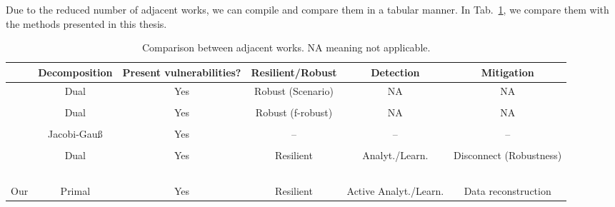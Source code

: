 \documentclass[../main.tex]{subfiles}
\begin{document}
Due to the reduced number of adjacent works, we can compile and compare them in a tabular manner.
In Tab.~\ref{tab:compare_works}, we compare them with the methods presented in this thesis.

\begin{landscape}
  \vspace*{\fill}
\begin{table}[H]
  \centering
  \begin{tabular}[h]{lccccc}
    \toprule
     & Decomposition & Present vulnerabilities?  & Resilient/Robust & Detection & Mitigation\\
    \midrule
    \parbox{20pt}{\cite{VelardeEtAl2017a}\\ \cite{MaestreEtAl2021}} & Dual & Yes & Robust (Scenario) & NA & NA\\\\
    \parbox{20pt}{\cite{VelardeEtAl2017b} \\ \cite{VelardeEtAl2018}} & Dual & Yes & Robust (f-robust) & NA & NA\\\\
    \cite{ChanfreutEtAl2018} & Jacobi-Gauß & Yes & -- & -- & --\\\\
    \parbox{40pt}{\cite{AnandutaEtAl2018}\\\cite{AnandutaEtAl2019}\\\cite{AnandutaEtAl2020}} & Dual & Yes & Resilient& Analyt./Learn. & Disconnect (Robustness)\\\\
    Our & Primal & Yes & Resilient & Active Analyt./Learn. & Data reconstruction\\
    \bottomrule
  \end{tabular}
  \caption[Comparison between adjacent works]{Comparison between adjacent works. NA meaning not applicable.}\label{tab:compare_works}
\end{table}
  \vspace*{\fill}
\end{landscape}
\end{document}

